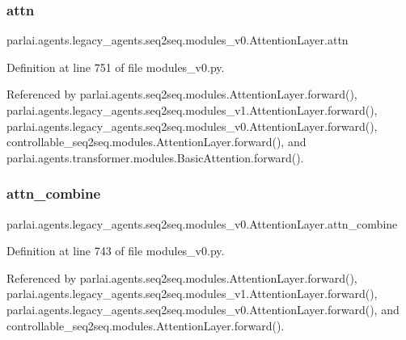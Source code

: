 \subsubsection{\texorpdfstring{attn}{attn}}
{\footnotesize\ttfamily parlai.\+agents.\+legacy\+\_\+agents.\+seq2seq.\+modules\+\_\+v0.\+Attention\+Layer.\+attn}



Definition at line 751 of file modules\+\_\+v0.\+py.



Referenced by parlai.\+agents.\+seq2seq.\+modules.\+Attention\+Layer.\+forward(), parlai.\+agents.\+legacy\+\_\+agents.\+seq2seq.\+modules\+\_\+v1.\+Attention\+Layer.\+forward(), parlai.\+agents.\+legacy\+\_\+agents.\+seq2seq.\+modules\+\_\+v0.\+Attention\+Layer.\+forward(), controllable\+\_\+seq2seq.\+modules.\+Attention\+Layer.\+forward(), and parlai.\+agents.\+transformer.\+modules.\+Basic\+Attention.\+forward().

\mbox{\label{classparlai_1_1agents_1_1legacy__agents_1_1seq2seq_1_1modules__v0_1_1AttentionLayer_acd4f27aecfab6e05a026061bdabc42aa}} 
\subsubsection{\texorpdfstring{attn\+\_\+combine}{attn\_combine}}
{\footnotesize\ttfamily parlai.\+agents.\+legacy\+\_\+agents.\+seq2seq.\+modules\+\_\+v0.\+Attention\+Layer.\+attn\+\_\+combine}



Definition at line 743 of file modules\+\_\+v0.\+py.



Referenced by parlai.\+agents.\+seq2seq.\+modules.\+Attention\+Layer.\+forward(), parlai.\+agents.\+legacy\+\_\+agents.\+seq2seq.\+modules\+\_\+v1.\+Attention\+Layer.\+forward(), parlai.\+agents.\+legacy\+\_\+agents.\+seq2seq.\+modules\+\_\+v0.\+Attention\+Layer.\+forward(), and controllable\+\_\+seq2seq.\+modules.\+Attention\+Layer.\+forward().

